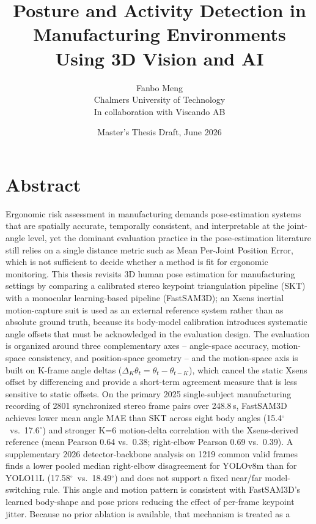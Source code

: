 \documentclass[12pt,a4paper]{article}
\title{\textbf{Posture and Activity Detection in Manufacturing Environments\\Using 3D Vision and AI}}
\author{Fanbo Meng\\
\small Chalmers University of Technology\\
\small In collaboration with Viscando AB}
\date{Master's Thesis Draft, June 2026}
\newcommand{\degr}{\ensuremath{^\circ}}
\begin{document}
\maketitle
\tableofcontents
\newpage

\section*{Abstract}

Ergonomic risk assessment in manufacturing demands pose-estimation systems
that are spatially accurate, temporally consistent, and interpretable at the
joint-angle level, yet the dominant evaluation practice in the pose-estimation
literature still relies on a single distance metric such as Mean Per-Joint
Position Error, which is not sufficient to decide whether a method is fit for
ergonomic monitoring.
This thesis revisits 3D human pose estimation for manufacturing settings by
comparing a calibrated stereo keypoint triangulation pipeline (SKT) with a
monocular learning-based pipeline (FastSAM3D); an Xsens inertial motion-capture
suit is used as an external reference system rather than as absolute ground
truth, because its body-model calibration introduces systematic angle offsets
that must be acknowledged in the evaluation design.
The evaluation is organized around three complementary axes -- angle-space
accuracy, motion-space consistency, and position-space geometry -- and the
motion-space axis is built on K-frame angle deltas
($\Delta_K\theta_t = \theta_t-\theta_{t-K}$), which cancel the static Xsens
offset by differencing and provide a short-term agreement measure that is
less sensitive to static offsets.
On the primary 2025 single-subject manufacturing recording of 2801 synchronized stereo frame
pairs over 248.8\,s, FastSAM3D achieves lower mean angle MAE than SKT across
eight body angles (15.4\degr\ vs.\ 17.6\degr) and stronger K=6 motion-delta
correlation with the Xsens-derived reference (mean Pearson 0.64 vs.\ 0.38;
right-elbow Pearson 0.69 vs.\ 0.39).
A supplementary 2026 detector-backbone analysis on 1219 common valid frames
finds a lower pooled median right-elbow disagreement for YOLOv8m than for
YOLO11L (17.58\degr\ vs.\ 18.49\degr) and does not support a fixed
near/far model-switching rule.
This angle and motion pattern is consistent with FastSAM3D's learned
body-shape and pose priors reducing the effect of per-frame keypoint jitter.
Because no prior ablation is available, that mechanism is treated as a
\end{document}
